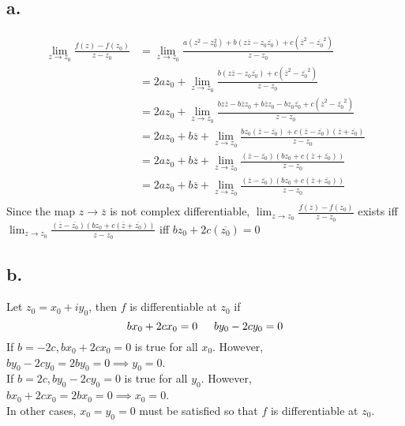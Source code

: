 \documentclass[11pt]{report}
\begin{document}
\subsection*{a.}
\begin{equation*}
    \begin{aligned}
        \lim_{z \to z_0} \frac{f(z) - f(z_0)}{z-z_0}
        &= \lim_{z \to z_0} \frac{a(z^2 - z_0^2) + b(z\overline{z} - z_0 \overline{z_0}) + c(\overline{z}^2-\overline{z_0}^2)}{z-z_0}  \\
        &= 2az_0 + \lim_{z \to z_0} \frac{b(z\overline{z} - z_0 \overline{z_0}) + c(\overline{z}^2-\overline{z_0}^2)}{z-z_0} \\
        &= 2az_0 + \lim_{z \to z_0} \frac{ bz\overline{z} -b\overline{z}z_0 + b\overline{z}z_0 -bz_0\overline{z_0} + c (\overline{z}^2 - \overline{z_0}^2)}{z-z_0} \\
        &= 2az_0 +b\overline{z} + \lim_{z \to z_0} \frac{bz_0(\overline{z} - \overline{z_0}) + c(\overline{z}-\overline{z_0})(\overline{z} + \overline{z_0})}{z-z_0} \\
        &= 2az_0 +b\overline{z} + \lim_{z \to z_0} \frac{(\overline{z} - \overline{z_0})(bz_0 + c(\overline{z} + \overline{z_0}))}{z-z_0} \\
        &= 2az_0 +b\overline{z} + \lim_{z \to z_0} \frac{(\overline{z} - \overline{z_0})(bz_0 + c(\overline{z} + \overline{z_0}))}{z-z_0} \\
    \end{aligned}
\end{equation*}
Since the map $z \to \overline{z}$ is not complex differentiable, $\lim_{z \to z_0} \frac{f(z) - f(z_0)}{z-z_0}$ exists iff
$\lim_{z \to z_0} \frac{(\overline{z} - \overline{z_0})(bz_0 + c(\overline{z} + \overline{z_0}))}{z-z_0}$ iff $bz_0 + 2c(\overline{z_0}) = 0$ \\
\subsection*{b.}
Let $z_0 = x_0 + iy_0$, then $f$ is differentiable at $z_0$ if
\[
    bx_0 + 2cx_0 = 0 \indent by_0 - 2cy_0 = 0
\]
If $b = -2c, bx_0 + 2cx_0 = 0$ is true for all $x_0$. However, $by_0 - 2cy_0 = 2by_0 = 0 \implies y_0=0$. \\
If $b = 2c, by_0 - 2cy_0 = 0$ is true for all $y_0$. However, $bx_0 + 2cx_0 = 2bx_0 =0 \implies x_0 = 0$. \\
In other cases, $x_0 = y_0 = 0$ must be satisfied so that $f$ is differentiable at $z_0$.
\newpage
\end{document}

